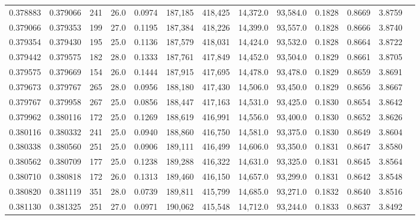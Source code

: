 \begin{tabular}{rrrrrrrrrrrrr}
0.378883 & 0.379066 &   241 & 26.0 &                                     0.0974 & 187,185 & 418,425 &  14,372.0 &  93,584.0 & 0.1828 & 0.8669 & 3.8759 \\
0.379066 & 0.379353 &   199 & 27.0 &                                     0.1195 & 187,384 & 418,226 &  14,399.0 &  93,557.0 & 0.1828 & 0.8666 & 3.8740 \\
0.379354 & 0.379430 &   195 & 25.0 &                                     0.1136 & 187,579 & 418,031 &  14,424.0 &  93,532.0 & 0.1828 & 0.8664 & 3.8722 \\
0.379442 & 0.379575 &   182 & 28.0 &                                     0.1333 & 187,761 & 417,849 &  14,452.0 &  93,504.0 & 0.1829 & 0.8661 & 3.8705 \\
0.379575 & 0.379669 &   154 & 26.0 &                                     0.1444 & 187,915 & 417,695 &  14,478.0 &  93,478.0 & 0.1829 & 0.8659 & 3.8691 \\
0.379673 & 0.379767 &   265 & 28.0 &                                     0.0956 & 188,180 & 417,430 &  14,506.0 &  93,450.0 & 0.1829 & 0.8656 & 3.8667 \\
0.379767 & 0.379958 &   267 & 25.0 &                                     0.0856 & 188,447 & 417,163 &  14,531.0 &  93,425.0 & 0.1830 & 0.8654 & 3.8642 \\
0.379962 & 0.380116 &   172 & 25.0 &                                     0.1269 & 188,619 & 416,991 &  14,556.0 &  93,400.0 & 0.1830 & 0.8652 & 3.8626 \\
0.380116 & 0.380332 &   241 & 25.0 &                                     0.0940 & 188,860 & 416,750 &  14,581.0 &  93,375.0 & 0.1830 & 0.8649 & 3.8604 \\
0.380338 & 0.380560 &   251 & 25.0 &                                     0.0906 & 189,111 & 416,499 &  14,606.0 &  93,350.0 & 0.1831 & 0.8647 & 3.8580 \\
0.380562 & 0.380709 &   177 & 25.0 &                                     0.1238 & 189,288 & 416,322 &  14,631.0 &  93,325.0 & 0.1831 & 0.8645 & 3.8564 \\
0.380710 & 0.380818 &   172 & 26.0 &                                     0.1313 & 189,460 & 416,150 &  14,657.0 &  93,299.0 & 0.1831 & 0.8642 & 3.8548 \\
0.380820 & 0.381119 &   351 & 28.0 &                                     0.0739 & 189,811 & 415,799 &  14,685.0 &  93,271.0 & 0.1832 & 0.8640 & 3.8516 \\
0.381130 & 0.381325 &   251 & 27.0 &                                     0.0971 & 190,062 & 415,548 &  14,712.0 &  93,244.0 & 0.1833 & 0.8637 & 3.8492 \\

\end{tabular}
